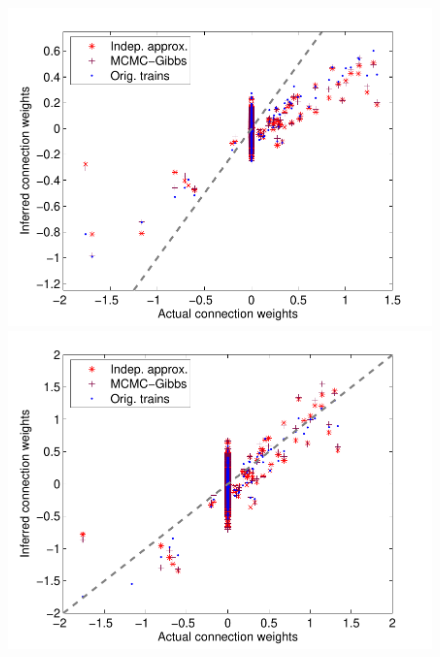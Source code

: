 \begin{figure}[h]
\centering
\begin{minipage}[c]{0.45\hsize}
\includegraphics[width=\hsize]{../figs/FigureA3_scatter_three}
\end{minipage}
\begin{minipage}[c]{0.45\hsize}
\includegraphics[width=\hsize]{../figs/FigureA3_scatter_three_corrected}
\end{minipage}
\begin{minipage}[c]{0.3\hsize}

\end{minipage}
\end{figure}
